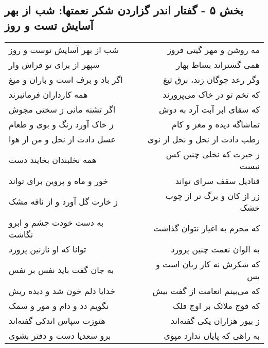 \begin{center}
\section*{بخش ۵ - گفتار اندر گزاردن شکر نعمتها: شب از بهر آسایش تست و روز}
\label{sec:005}
\begin{longtable}{l p{0.5cm} r}
شب از بهر آسایش توست و روز
&&
مه روشن و مهر گیتی فروز
\\
سپهر از برای تو فراش وار
&&
همی گستراند بساط بهار
\\
اگر باد و برف است و باران و میغ
&&
وگر رعد چوگان زند، برق تیغ
\\
همه کارداران فرمانبرند
&&
که تخم تو در خاک می‌پرورند
\\
اگر تشنه مانی ز سختی مجوش
&&
که سقای ابر آبت آرد به دوش
\\
ز خاک آورد رنگ و بوی و طعام
&&
تماشاگه دیده و مغز و کام
\\
عسل دادت از نحل و من از هوا
&&
رطب دادت از نخل و نخل از نوی
\\
همه نخلبندان بخایند دست
&&
ز حیرت که نخلی چنین کس نبست
\\
خور و ماه و پروین برای تواند
&&
قنادیل سقف سرای تواند
\\
ز خارت گل آورد و از نافه مشک
&&
زر از کان و برگ تر از چوب خشک
\\
به دست خودت چشم و ابرو نگاشت
&&
که محرم به اغیار نتوان گذاشت
\\
توانا که او نازنین پرورد
&&
به الوان نعمت چنین پرورد
\\
به جان گفت باید نفس بر نفس
&&
که شکرش نه کار زبان است و بس
\\
خدایا دلم خون شد و دیده ریش
&&
که می‌بینم انعامت از گفت بیش
\\
نگویم دد و دام و مور و سمک
&&
که فوج ملائک بر اوج فلک
\\
هنوزت سپاس اندکی گفته‌اند
&&
ز بیور هزاران یکی گفته‌اند
\\
برو سعدیا دست و دفتر بشوی
&&
به راهی که پایان ندارد مپوی
\\
\end{longtable}
\end{center}
